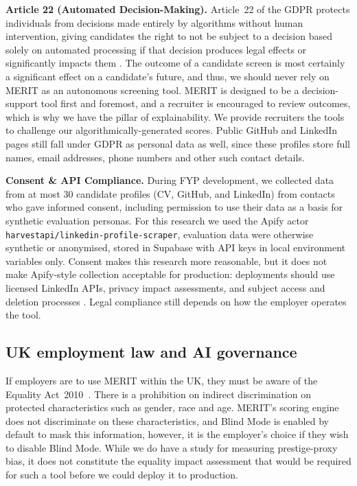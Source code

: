 \textbf{Article 22 (Automated Decision-Making).} Article~22 of the GDPR protects individuals from decisions made entirely by algorithms without human intervention, giving candidates
the right to not be subject to a decision based solely on automated processing if that decision produces legal effects or significantly 
impacts them \cite{eu_gdpr_2016}. The outcome of a candidate screen is most certainly a significant effect on a candidate's future, and thus, we should 
never rely on MERIT as an autonomous screening tool. MERIT is designed to be a decision-support tool first and foremost, and a recruiter
is encouraged to review outcomes, which is why we have the pillar of explainability. We provide recruiters the tools to challenge
our algorithmically-generated scores. Public GitHub and LinkedIn pages still fall under GDPR as personal data as well, since
these profiles store full names, email addresses, phone numbers and other such contact details.

\textbf{Consent \& API Compliance.} During FYP development, we collected data from at most 30 candidate profiles (CV, GitHub, and LinkedIn) from contacts who gave informed consent,
including permission to use their data as a basis for synthetic evaluation personas. For this research we used the Apify actor
\texttt{harvestapi/linkedin-profile-scraper}, evaluation data were otherwise synthetic or anonymised, stored in Supabase with API keys in local
environment variables only. Consent makes this research more reasonable, but it does not make Apify-style collection acceptable for production:
deployments should use licensed LinkedIn APIs, privacy impact assessments, and subject access and deletion processes \cite{ico_employment_2023}.
Legal compliance still depends on how the employer operates the tool.

\subsection{UK employment law and AI governance}
\label{sec:uk-ai-governance}

If employers are to use MERIT within the UK, they must be aware of the Equality Act~2010~\cite{uk_equality_act_2010}.
There is a prohibition on indirect discrimination on protected characteristics such as gender, race and age. MERIT's scoring engine
does not discriminate on these characteristics, and Blind Mode is enabled by default to mask this information, however, it is the
employer's choice if they wish to disable Blind Mode. While we do have a study for measuring prestige-proxy bias, it does not
constitute the equality impact assessment that would be required for such a tool before we could deploy it to production.

